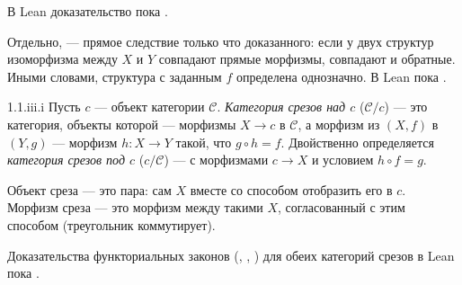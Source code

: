 \begin{remark}
В Lean доказательство пока .
\end{remark}

\begin{remark}
Отдельно,  — прямое следствие только что доказанного: если у
двух структур изоморфизма между $X$ и $Y$ совпадают прямые морфизмы, совпадают и
обратные. Иными словами, структура  с заданным $f$ определена
однозначно. В Lean пока .
\end{remark}

\begin{exercise}{1.1.iii.i}{}
Пусть $c$ — объект категории $\mathcal{C}$. \emph{Категория срезов над $c$} ($\mathcal{C}/c$)
— это категория, объекты которой — морфизмы $X \to c$ в $\mathcal{C}$, а морфизм из
$(X,f)$ в $(Y,g)$ — морфизм $h \colon X \to Y$ такой, что $g \circ h = f$. Двойственно
определяется \emph{категория срезов под $c$} ($c/\mathcal{C}$) — с морфизмами $c \to X$ и
условием $h \circ f = g$.
\end{exercise}

\begin{intuition}
Объект среза — это пара: сам $X$ вместе со способом отобразить его в $c$. Морфизм среза
— это морфизм между такими $X$, согласованный с этим способом (треугольник
коммутирует).

\begin{center}
\end{center}
\end{intuition}

\begin{remark}
Доказательства функториальных законов (, , )
для обеих категорий срезов в Lean пока .
\end{remark}
